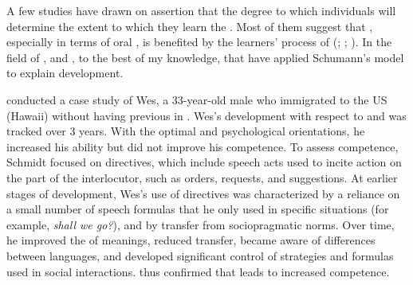 \documentclass[output=paper]{langsci/langscibook}
\begin{document}
A few studies have drawn on  assertion that the degree to which individuals  will determine the extent to which they learn the . Most of them suggest that  , especially in terms of oral , is benefited by the learners’ process of  (\citealt{Hansen1995}; \citealt{Lybeck2002}; \citealt{JiangEtAl2009}). In the field of ,  and \cite{DörnyeiEtAl2004}, to the best of my knowledge, that have applied Schumann’s model to explain   development.

\citet{Schmidt1983} conducted a case study of Wes, a 33-year-old  male who immigrated to the US (Hawaii) without having previous  in . Wes’s development with respect to  and   was tracked over 3 years. With the optimal  and psychological orientations, he increased his  ability but did not improve his  competence. To assess  competence, Schmidt focused on directives, which include speech acts used to incite action on the part of the interlocutor, such as orders, requests, and suggestions. At earlier stages of  development, Wes’s use of directives was characterized by a reliance on a small number of speech formulas that he only used in specific situations (for example, \textit{shall we go?}), and by transfer from  sociopragmatic norms. Over time, he improved the  of meanings, reduced  transfer, became aware of differences between languages, and developed significant control of  strategies and formulas used in social interactions. \cite{Schmidt1983} thus confirmed that  leads to increased   competence.
\end{document}
